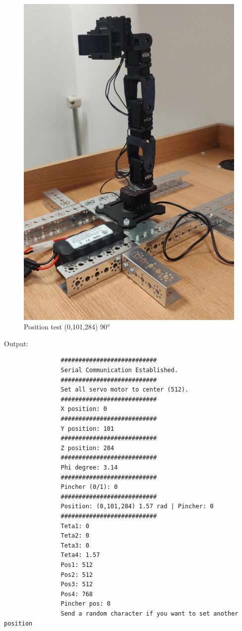 			\begin{figure}[H]
				\centering
				\includegraphics[scale=0.11]{./images/test_2}
				\caption{Position test (0,101,284) 90°}
			\end{figure}
			
			Output: 
			
			\begin{verbatim}
				###########################
				Serial Communication Established.
				###########################
				Set all servo motor to center (512).
				###########################
				X position: 0
				###########################
				Y position: 101
				###########################
				Z position: 284
				###########################
				Phi degree: 3.14
				###########################
				Pincher (0/1): 0
				###########################
				Position: (0,101,284) 1.57 rad | Pincher: 0
				###########################
				Teta1: 0
				Teta2: 0
				Teta3: 0
				Teta4: 1.57
				Pos1: 512
				Pos2: 512
				Pos3: 512
				Pos4: 768
				Pincher pos: 0
				Send a random character if you want to set another position
			\end{verbatim}
			
